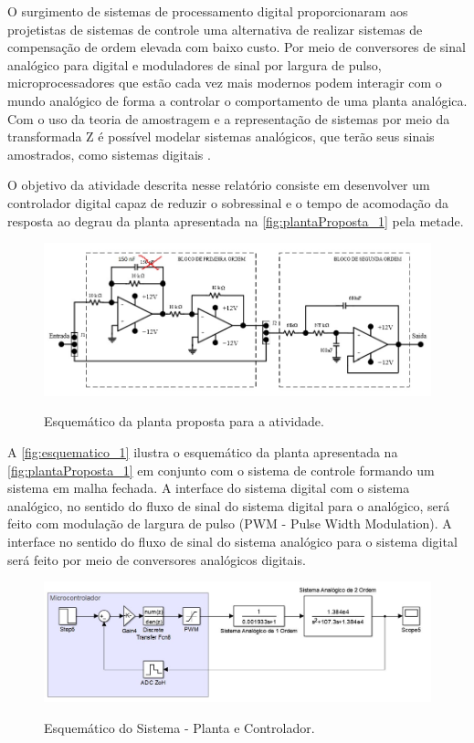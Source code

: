 \documentclass[
	article,			%
	11pt,				%
	oneside,			%
	a4paper,			%
	english,			%
	brazil,				%
	sumario=tradicional
	]{abntex2}
\begin{document}
O surgimento de sistemas de processamento digital proporcionaram aos projetistas de sistemas de controle uma alternativa de realizar sistemas de compensação de ordem elevada com baixo custo. 
Por meio de conversores de sinal analógico para digital e moduladores de sinal por largura de pulso, microprocessadores que estão cada vez mais modernos podem interagir com o mundo analógico de forma a controlar o comportamento de uma planta analógica. 
Com o uso da teoria de amostragem e a representação de sistemas por meio da transformada Z é possível modelar sistemas analógicos, que terão seus sinais amostrados, como sistemas digitais \cite{Ogata_DTC_1995}.

O objetivo da atividade descrita nesse relatório consiste em desenvolver um controlador digital capaz de reduzir o sobressinal e o tempo de acomodação da resposta ao degrau da planta apresentada na \autoref{fig:plantaProposta_1} pela metade.



\begin{figure}[htb!]
	\centering
	\caption{Esquemático da planta proposta para a atividade.}
	\includegraphics[scale=0.6]{./img/plantaProposta.jpg}
	\label{fig:plantaProposta_1}
\end{figure}

A \autoref{fig:esquematico_1} ilustra o esquemático da planta apresentada na \autoref{fig:plantaProposta_1} em conjunto com o sistema de controle formando um sistema em malha fechada.
A interface do sistema digital com o sistema analógico, no sentido do fluxo de sinal do sistema digital para o analógico, será feito com modulação de largura de pulso (PWM - Pulse Width Modulation). 
A interface no sentido do fluxo de sinal do sistema analógico para o sistema digital será feito por meio de conversores analógicos digitais.

\begin{figure}[htb!]
	\centering
	\caption{Esquemático do Sistema - Planta e Controlador.}
	\includegraphics[scale=0.5]{./img/modeloSistemaDeControle_intro.JPG}
	\label{fig:esquematico_1}
\end{figure}
\end{document}
